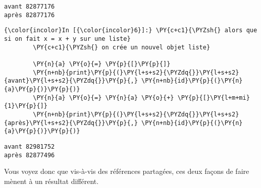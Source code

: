     \begin{Verbatim}[commandchars=\\\{\}]
avant 82877176
après 82877176

    \end{Verbatim}

    \begin{Verbatim}[commandchars=\\\{\}]
{\color{incolor}In [{\color{incolor}6}]:} \PY{c+c1}{\PYZsh{} alors que si on fait x = x + y sur une liste}
        \PY{c+c1}{\PYZsh{} on crée un nouvel objet liste}
        
        \PY{n}{a} \PY{o}{=} \PY{p}{[}\PY{p}{]}
        \PY{n+nb}{print}\PY{p}{(}\PY{l+s+s2}{\PYZdq{}}\PY{l+s+s2}{avant}\PY{l+s+s2}{\PYZdq{}}\PY{p}{,} \PY{n+nb}{id}\PY{p}{(}\PY{n}{a}\PY{p}{)}\PY{p}{)}
        \PY{n}{a} \PY{o}{=} \PY{n}{a} \PY{o}{+} \PY{p}{[}\PY{l+m+mi}{1}\PY{p}{]}
        \PY{n+nb}{print}\PY{p}{(}\PY{l+s+s2}{\PYZdq{}}\PY{l+s+s2}{après}\PY{l+s+s2}{\PYZdq{}}\PY{p}{,} \PY{n+nb}{id}\PY{p}{(}\PY{n}{a}\PY{p}{)}\PY{p}{)}
\end{Verbatim}


    \begin{Verbatim}[commandchars=\\\{\}]
avant 82981752
après 82877496

    \end{Verbatim}

    Vous voyez donc que vis-à-vis des références partagées, ces deux façons
de faire mènent à un résultat différent.